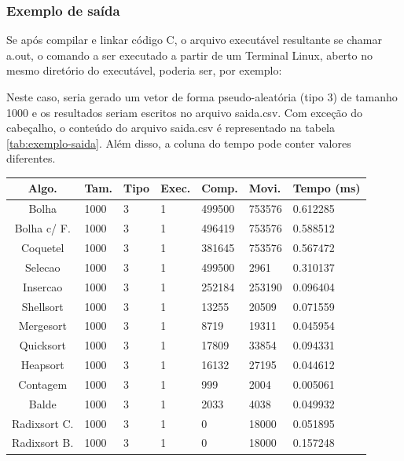 \subsubsection{Exemplo de saída}
Se após compilar e linkar código C, o arquivo executável resultante se chamar a.out, o comando a ser executado a partir de um Terminal Linux, aberto no mesmo diretório do executável, poderia ser, por exemplo:

Neste caso, seria gerado um vetor de forma pseudo-aleatória (tipo 3) de tamanho 1000 e os resultados seriam escritos no arquivo saida.csv. Com exceção do cabeçalho, o conteúdo do arquivo saida.csv é representado na tabela \ref{tab:exemplo-saida}. Além disso, a coluna do tempo pode conter valores diferentes.
\begin{table}[H]
    \centering
    \begin{tabular}{ c | l | l | l | l | l | l }
        \hline
        Algo. & Tam. & Tipo & Exec. & Comp. & Movi. & Tempo (ms)\\
        \hline
        Bolha & 1000 & 3 & 1 & 499500 & 753576 & 0.612285\\
        \hline
        Bolha c/ F. & 1000 & 3 & 1 & 496419 & 753576 & 0.588512\\
        \hline
        Coquetel & 1000 & 3 & 1 & 381645 & 753576 & 0.567472\\
        \hline
        Selecao & 1000 & 3 & 1 & 499500 & 2961 & 0.310137\\
        \hline
        Insercao & 1000 & 3 & 1 & 252184 & 253190 & 0.096404\\
        \hline
        Shellsort & 1000 & 3 & 1 & 13255 & 20509 & 0.071559\\
        \hline
        Mergesort & 1000 & 3 & 1 & 8719 & 19311 & 0.045954\\
        \hline
        Quicksort & 1000 & 3 & 1 & 17809 & 33854 & 0.094331\\
        \hline
        Heapsort & 1000 & 3 & 1 & 16132 & 27195 & 0.044612\\
        \hline
        Contagem & 1000 & 3 & 1 & 999 & 2004 & 0.005061\\
        \hline
        Balde & 1000 & 3 & 1 & 2033 & 4038 & 0.049932\\
        \hline
        Radixsort C. & 1000 & 3 & 1 & 0 & 18000 & 0.051895\\
        \hline
        Radixsort B. & 1000 & 3 & 1 & 0 & 18000 & 0.157248\\
        \hline
    \end{tabular}
\end{table}

